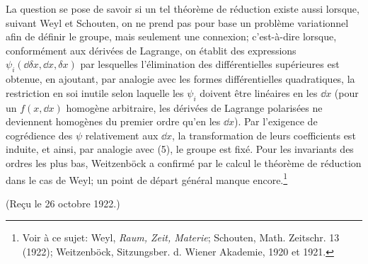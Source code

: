 La question se pose de savoir si un tel théorème de réduction existe aussi lorsque, suivant Weyl et Schouten, on ne prend pas pour base un problème variationnel afin de définir le groupe, mais seulement une connexion; c'est-à-dire lorsque, conformément aux dérivées de Lagrange, on établit des expressions $\psi_i(\dd\delta x,\dd x,\delta x)$ par lesquelles l'élimination des différentielles supérieures est obtenue, en ajoutant, par analogie avec les formes différentielles quadratiques, la restriction en soi inutile selon laquelle les $\psi_i$ doivent être linéaires en les $\dd x$ (pour un $f(x,\dd x)$ homogène arbitraire, les dérivées de Lagrange polarisées ne deviennent homogènes du premier ordre qu'en les $\dd x$). Par l'exigence de cogrédience des $\psi$ relativement aux $\dd x$, la transformation de leurs coefficients est induite, et ainsi, par analogie avec (5), le groupe est fixé. Pour les invariants des ordres les plus bas, Weitzenböck a confirmé par le calcul le théorème de réduction dans le cas de Weyl; un point de départ général manque encore.\footnote{Voir à ce sujet: Weyl, \emph{Raum, Zeit, Materie}; Schouten, Math. Zeitschr. 13 (1922); Weitzenböck, Sitzungsber. d. Wiener Akademie, 1920 et 1921.}

\begin{center}
(Reçu le 26 octobre 1922.)
\end{center}
